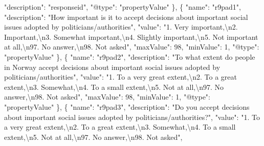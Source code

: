 \documentclass[
]{book}
\newenvironment{Shaded}{\begin{snugshade}}{\end{snugshade}}
\newcommand{\CharTok}[1]{\textcolor[rgb]{0.31,0.60,0.02}{#1}}
\newcommand{\DataTypeTok}[1]{\textcolor[rgb]{0.13,0.29,0.53}{#1}}
\newcommand{\DecValTok}[1]{\textcolor[rgb]{0.00,0.00,0.81}{#1}}
\newcommand{\FunctionTok}[1]{\textcolor[rgb]{0.00,0.00,0.00}{#1}}
\newcommand{\OtherTok}[1]{\textcolor[rgb]{0.56,0.35,0.01}{#1}}
\newcommand{\StringTok}[1]{\textcolor[rgb]{0.31,0.60,0.02}{#1}}
\begin{document}
\begin{Shaded}
\begin{Highlighting}[]
      \DataTypeTok{"description"}\FunctionTok{:} \StringTok{"responseid"}\FunctionTok{,}
      \DataTypeTok{"@type"}\FunctionTok{:} \StringTok{"propertyValue"}
    \FunctionTok{\}}\OtherTok{,}
    \FunctionTok{\{}
      \DataTypeTok{"name"}\FunctionTok{:} \StringTok{"r9pad1"}\FunctionTok{,}
      \DataTypeTok{"description"}\FunctionTok{:} \StringTok{"How important is it to accept decisions about important social issues adopted by politicians/authorities"}\FunctionTok{,}
      \DataTypeTok{"value"}\FunctionTok{:} \StringTok{"1. Very important,}\CharTok{\textbackslash{}n}\StringTok{2. Important,}\CharTok{\textbackslash{}n}\StringTok{3. Somewhat important,}\CharTok{\textbackslash{}n}\StringTok{4. Slightly important,}\CharTok{\textbackslash{}n}\StringTok{5. Not important at all,}\CharTok{\textbackslash{}n}\StringTok{97. No answer,}\CharTok{\textbackslash{}n}\StringTok{98. Not asked"}\FunctionTok{,}
      \DataTypeTok{"maxValue"}\FunctionTok{:} \DecValTok{98}\FunctionTok{,}
      \DataTypeTok{"minValue"}\FunctionTok{:} \DecValTok{1}\FunctionTok{,}
      \DataTypeTok{"@type"}\FunctionTok{:} \StringTok{"propertyValue"}
    \FunctionTok{\}}\OtherTok{,}
    \FunctionTok{\{}
      \DataTypeTok{"name"}\FunctionTok{:} \StringTok{"r9pad2"}\FunctionTok{,}
      \DataTypeTok{"description"}\FunctionTok{:} \StringTok{"To what extent do people in Norway accept decisions about important social issues adopted by politicians/authorities"}\FunctionTok{,}
      \DataTypeTok{"value"}\FunctionTok{:} \StringTok{"1. To a very great extent,}\CharTok{\textbackslash{}n}\StringTok{2. To a great extent,}\CharTok{\textbackslash{}n}\StringTok{3. Somewhat,}\CharTok{\textbackslash{}n}\StringTok{4. To a small extent,}\CharTok{\textbackslash{}n}\StringTok{5. Not at all,}\CharTok{\textbackslash{}n}\StringTok{97. No answer,}\CharTok{\textbackslash{}n}\StringTok{98. Not asked"}\FunctionTok{,}
      \DataTypeTok{"maxValue"}\FunctionTok{:} \DecValTok{98}\FunctionTok{,}
      \DataTypeTok{"minValue"}\FunctionTok{:} \DecValTok{1}\FunctionTok{,}
      \DataTypeTok{"@type"}\FunctionTok{:} \StringTok{"propertyValue"}
    \FunctionTok{\}}\OtherTok{,}
    \FunctionTok{\{}
      \DataTypeTok{"name"}\FunctionTok{:} \StringTok{"r9pad3"}\FunctionTok{,}
      \DataTypeTok{"description"}\FunctionTok{:} \StringTok{"Do you accept decisions about important social issues adopted by politicians/authorities?"}\FunctionTok{,}
      \DataTypeTok{"value"}\FunctionTok{:} \StringTok{"1. To a very great extent,}\CharTok{\textbackslash{}n}\StringTok{2. To a great extent,}\CharTok{\textbackslash{}n}\StringTok{3. Somewhat,}\CharTok{\textbackslash{}n}\StringTok{4. To a small extent,}\CharTok{\textbackslash{}n}\StringTok{5. Not at all,}\CharTok{\textbackslash{}n}\StringTok{97. No answer,}\CharTok{\textbackslash{}n}\StringTok{98. Not asked"}\FunctionTok{,}

\end{Highlighting}
\end{Shaded}
\end{document}
